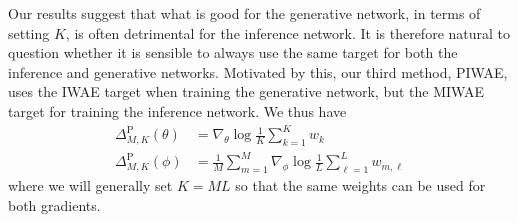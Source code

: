 Our results suggest that what is good for the generative
network, in terms of setting $K$, is often detrimental for the inference 
network.  It is therefore natural to question whether it is sensible
to always use the same target for both the inference and generative networks.
Motivated by this,
our third method, \gls{PIWAE}, uses the \gls{IWAE} target when
training the generative network, but the \gls{MIWAE} target for training
the inference network.  We thus have
\begin{subequations}
\begin{align}
\label{eq:PIWAE-est}
\Delta_{M,K}^{\text{P}} (\theta) &= \nabla_{\theta} \log \frac{1}{K}
\sum\nolimits_{k=1}^{K} w_k \\
\Delta_{M,K}^{\text{P}} (\phi) &= \frac{1}{M} \sum\nolimits_{m=1}^{M}
\nabla_{\phi} \log \frac{1}{L} \sum\nolimits_{\ell=1}^{L} w_{m,\ell}
\end{align}
\end{subequations}
where we will generally set $K=ML$ so that the same weights can be
used for both gradients.  